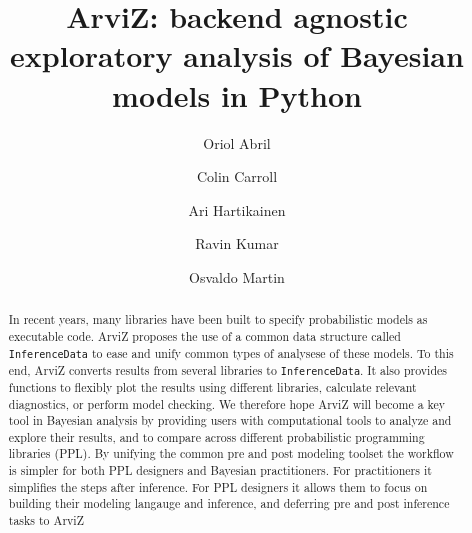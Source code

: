 \documentclass[anonymous=false, %
               format=acmsmall, %
               review=true, %
               screen=true, %
               nonacm=true]{acmart}
\begin{document}
\title{{ArviZ}: backend agnostic exploratory analysis of
{Bayesian} models in {Python}}

\author{Oriol Abril}
\affiliation{%
}

\author{Colin Carroll}
\affiliation{%
}

\author{Ari Hartikainen}
\affiliation{%
}

\author{Ravin Kumar}
\affiliation{%
}

\author{Osvaldo Martin}

\begin{abstract}
  In recent years, many libraries have been built to specify probabilistic models
  as executable code. ArviZ proposes the use of a common data structure called
  \texttt{InferenceData} to ease and unify common types of analysese of these models. To this end,
  ArviZ converts results from several libraries to
  \texttt{InferenceData}. It also provides functions to flexibly plot the results using different
  libraries, calculate relevant diagnostics, or perform model checking.
  We therefore hope ArviZ will become a key tool in Bayesian analysis by
  providing users with computational tools to analyze and explore their results, and to
  compare across different probabilistic programming libraries (PPL).
  By unifying the common pre and post modeling toolset the workflow is simpler
  for both PPL designers and Bayesian practitioners. For practitioners it
  simplifies the steps after inference. For PPL designers it allows them to
  focus on building their modeling langauge and inference, and deferring
  pre and post inference tasks to ArviZ
\end{abstract}
\end{document}
